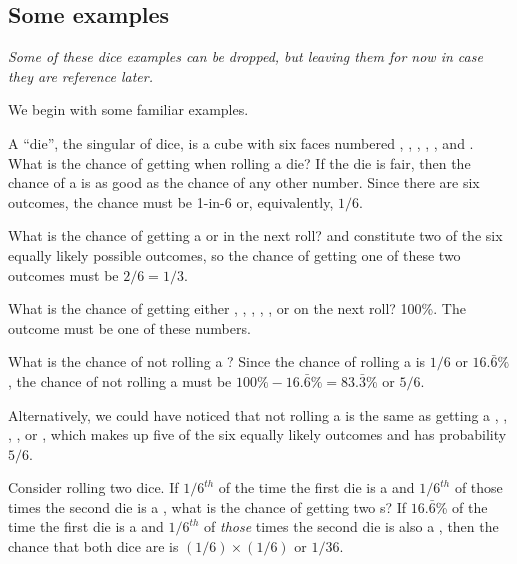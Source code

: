 \subsection{Some examples}

\textit{Some of these dice examples can be dropped, but leaving them for now in case they are reference later. }

We begin with some familiar examples.

\begin{example}\label{dieAllOutcomesex}{A ``die'', the singular of dice, is a cube with six faces numbered , , , , , and . What is the chance of getting  when rolling a die?}\label{probOf1}
If the die is fair, then the chance of a  is as good as the chance of any other number. Since there are six outcomes, the chance must be 1-in-6 or, equivalently, $1/6$.
\end{example}

\begin{example}{What is the chance of getting a  or  in the next roll?}\label{probOf1Or2}
 and  constitute two of the six equally likely possible outcomes, so the chance of getting one of these two outcomes must be $2/6 = 1/3$.
\end{example}

\begin{example}{What is the chance of getting either , , , , , or  on the next roll?}\label{probOf123456}
100\%. The outcome must be one of these numbers.
\end{example}

\begin{example}{What is the chance of not rolling a ?}\label{probNot2}
Since the chance of rolling a  is $1/6$ or $16.\bar{6}\%$, the chance of not rolling a  must be $100\% - 16.\bar{6}\%=83.\bar{3}\%$ or $5/6$.

Alternatively, we could have noticed that not rolling a  is the same as getting a , , , , or , which makes up five of the six equally likely outcomes and has probability $5/6$.
\end{example}

\begin{example}\label{dieProportionProbex} {Consider rolling two dice. If $1/6^{th}$ of the time the first die is a  and $1/6^{th}$ of those times the second die is a , what is the chance of getting two s?}\label{probOf2Ones}
If $16.\bar{6}$\% of the time the first die is a  and $1/6^{th}$ of \emph{those} times the second die is also a , then the chance that both dice are  is $(1/6)\times (1/6)$ or $1/36$.
\end{example}

